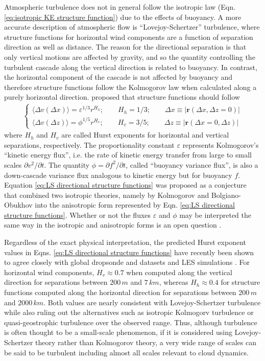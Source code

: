 \documentclass[acp, manuscript, english]{copernicus}
\begin{document}
Atmospheric turbulence does not in general follow the isotropic law (Eqn. \ref{eq:isotropic KE structure function}) due to the effects of buoyancy. A more accurate description of atmospheric flow is ``Lovejoy-Schertzer'' turbulence, where structure functions for horizontal wind components are a function of separation direction as well as distance. The reason for the directional separation is that only vertical motions are affected by gravity, and so the quantity controlling the turbulent cascade along the vertical direction is related to buoyancy. In contrast, the horizontal component of the cascade is not affected by buoyancy and therefore structure functions follow the Kolmogorov law when calculated along a purely horizontal direction. \citet{lovejoy1985} proposed that structure functions should follow
\begin{align}
  \begin{cases}
    \langle\Delta v (\Delta x)\rangle = \varepsilon^{1/3} r^{H_h}; \qquad H_h=1/3; \qquad \Delta x \equiv |\mathbf{r}(\Delta x, \Delta z=0)|\\
      \langle\Delta v (\Delta z)\rangle = \phi^{1/5} r^{H_v}; \qquad H_v=3/5;\qquad \Delta z \equiv |\mathbf{r}(\Delta x=0, \Delta z)| 
\end{cases}\label{eq:LS directional structure functions}
\end{align} 
where $H_h$ and $H_v$ are called Hurst exponents for horizontal and vertical separations, respectively. The proportionality constant $\varepsilon$ represents Kolmogorov's ``kinetic energy flux'', i.e. the rate of kinetic energy transfer from large to small scales $\partial v^2/\partial t$. The quantity $\phi=\partial f^2/\partial t$, called ``buoyancy variance flux'', is also a down-cascade variance flux analogous to kinetic energy but for buoyancy $f$. Equation \ref{eq:LS directional structure functions} was proposed as a conjecture that combined two isotropic theories, namely by Kolmogorov and Bolgiano-Obukhov into the anisotropic form represented by Eqn. \ref{eq:LS directional structure functions}. Whether or not the fluxes $\varepsilon$ and $\phi$ may be interpreted the same way in the isotropic and anisotropic forms is an open question \citep{dewitt2025bpreprint}. 

Regardless of the exact physical interpretation, the predicted Hurst exponent values in Eqns. \ref{eq:LS directional structure functions} have recently been shown to agree closely with global dropsonde and datasets and LES simulations \citep{dewitt2025bpreprint}. For horizontal wind components, $H_v\approx 0.7$ when computed along the vertical direction for separations between $200\,\unit{m}$ and $7\,\unit{km}$, whereas $H_h\approx 0.4$ for structure functions computed along the horizontal direction for separations between $200\,\unit{m}$ and $2000\,\unit{km}$. Both values are nearly consistent with Lovejoy-Schertzer turbulence while also ruling out the alternatives such as isotropic Kolmogorv turbulence or quasi-geostrophic turbulence over the observed range. Thus, although turbulence is often thought to be a small-scale phenomenon, if it is considered using Lovejoy-Schertzer theory rather than Kolmogorov theory, a very wide range of scales can be said to be turbulent including almost all scales relevant to cloud dynamics.
\end{document}
